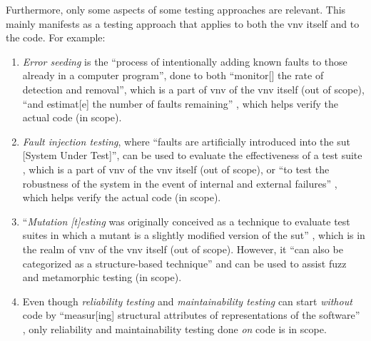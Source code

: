 Furthermore, only some aspects of some testing approaches are relevant. This
mainly manifests as a testing approach that applies to both the \acs{vnv} itself
and to the code. For example:

\begin{enumerate}
    \item \emph{Error seeding} is the ``process of intentionally adding
          known faults to those already in a computer program'',
          done to both ``monitor[] the rate of detection and removal'',
          which is a part of \acs{vnv} of the \acs{vnv} itself (out of scope),
          ``and estimat[e] the number of faults remaining''
          \citep[p.~165]{IEEE2017}, which helps verify the actual code (in scope).
    \item \emph{Fault injection testing}, where ``faults are artificially
          introduced into the \acs{sut} [System Under Test]'', can be used to
          evaluate the effectiveness of a test suite \citep[p.~5-18]{SWEBOK2024},
          which is a part of \acs{vnv} of the \acs{vnv} itself (out of scope),
          or ``to test
          the robustness of the system in the event of internal and
          external failures'' \citep[p.~42]{IEEE2022}, which helps verify
          the actual code (in scope).
    \item ``\emph{Mutation [t]esting} was originally conceived as a
          technique to evaluate test suites in which a mutant is a slightly
          modified version of the \acs{sut}'' \citep[p.~5-15]{SWEBOK2024},
          which is in the realm of \acs{vnv} of the \acs{vnv} itself (out of
          scope). However, it ``can also be categorized as a structure-based
          technique'' and can be used to assist fuzz and metamorphic testing
          \citep[p.~5-15]{SWEBOK2024} (in scope).
          \ifnotpaper
    \item Even though \emph{reliability testing} and \emph{maintainability
              testing} can start \emph{without} code by ``measur[ing]
          structural attributes of representations of the software''
          \citep[p.~18]{FentonAndPfleeger1997}, only reliability and
          maintainability testing done \emph{on} code is in scope.
          \fi
\end{enumerate}

\ifnotpaper
